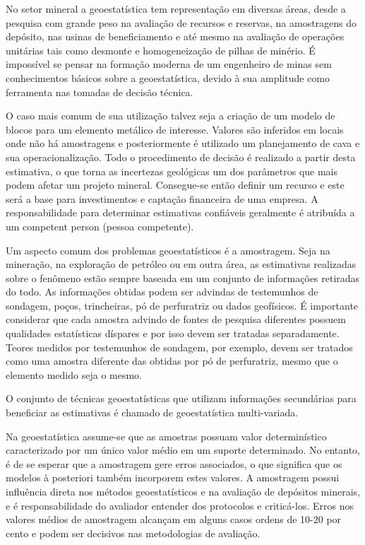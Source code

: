 No setor mineral a geoestatística tem representação em diversas áreas, desde a pesquisa com grande peso na avaliação de recursos e reservas, na amostragens do depósito, nas usinas de beneficiamento e até mesmo na avaliação de operações unitárias tais como desmonte e homogeneização de pilhas de minério. É impossível se pensar na formação moderna de um engenheiro de minas sem conhecimentos básicos sobre a geoestatística, devido à sua amplitude como ferramenta nas tomadas de decisão técnica.  

O caso mais comum de sua utilização talvez seja a criação de um modelo de blocos para um elemento metálico de interesse. Valores são inferidos em locais onde não há amostragens e posteriormente é utilizado um planejamento de cava e sua operacionalização. Todo o procedimento de decisão é realizado a partir desta estimativa, o que torna as incertezas geológicas um dos parâmetros que mais podem afetar um projeto mineral. Consegue-se então definir um recurso e este será a base para investimentos e captação financeira de uma empresa. A responsabilidade para determinar estimativas confiáveis geralmente é atribuída a um competent person (pessoa competente).   

 Um aspecto comum dos problemas geoestatísticos é a amostragem. Seja na mineração, na exploração de petróleo ou em outra área, as estimativas realizadas sobre o fenômeno estão sempre baseada em um conjunto de informações retiradas do todo. As informações obtidas podem ser advindas de testemunhos de sondagem, poços, trincheiras, pó de perfuratriz ou dados geofísicos. É importante considerar que cada amostra advindo de fontes de pesquisa diferentes possuem qualidades estatísticas díspares e por isso devem ser tratadas separadamente. Teores medidos por testemunhos de sondagem, por exemplo, devem ser tratados como uma amostra diferente das obtidas por pó de perfuratriz, mesmo que o elemento medido seja o mesmo.

O conjunto de técnicas geoestatísticas que utilizam informações secundárias para beneficiar as estimativas é chamado de geoestatística multi-variada.   

Na geoestatística assume-se que as amostras possuam valor determinístico caracterizado por um único valor médio em um suporte determinado. No entanto, é de se esperar que a amostragem gere erros associados, o que significa que os modelos à posteriori também incorporem estes valores. A amostragem possui influência direta nos métodos geoestatísticos e na avaliação de depósitos minerais, e é responsabilidade do avaliador entender dos protocolos e criticá-los. Erros nos valores médios de amostragem alcançam em alguns casos ordens de 10-20 por cento e podem ser decisivos nas metodologias de avaliação.

